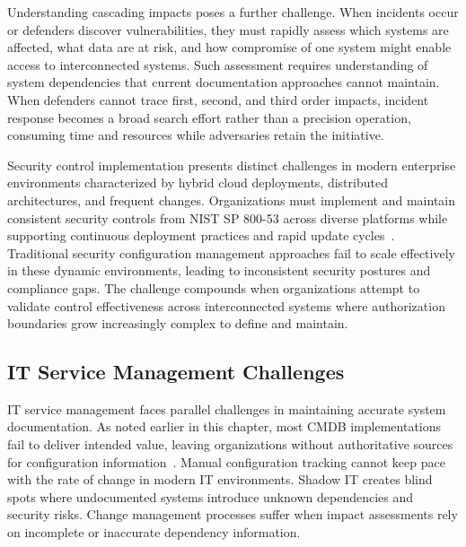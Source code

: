 Understanding cascading impacts poses a further challenge. When incidents occur or defenders discover vulnerabilities, they must rapidly assess which systems are affected, what data are at risk, and how compromise of one system might enable access to interconnected systems. Such assessment requires understanding of system dependencies that current documentation approaches cannot maintain. When defenders cannot trace first, second, and third order impacts, incident response becomes a broad search effort rather than a precision operation, consuming time and resources while adversaries retain the initiative.

Security control implementation presents distinct challenges in modern enterprise environments characterized by hybrid cloud deployments, distributed architectures, and frequent changes. Organizations must implement and maintain consistent security controls from NIST SP 800-53 across diverse platforms while supporting continuous deployment practices and rapid update cycles~\parencite{Force_2020}. Traditional security configuration management approaches fail to scale effectively in these dynamic environments, leading to inconsistent security postures and compliance gaps. The challenge compounds when organizations attempt to validate control effectiveness across interconnected systems where authorization boundaries grow increasingly complex to define and maintain.

\subsection{IT Service Management Challenges}

IT service management faces parallel challenges in maintaining accurate system documentation. As noted earlier in this chapter, most CMDB implementations fail to deliver intended value, leaving organizations without authoritative sources for configuration information~\parencite{Gartner_CMDB_2019}. Manual configuration tracking cannot keep pace with the rate of change in modern IT environments. Shadow IT creates blind spots where undocumented systems introduce unknown dependencies and security risks. Change management processes suffer when impact assessments rely on incomplete or inaccurate dependency information.


